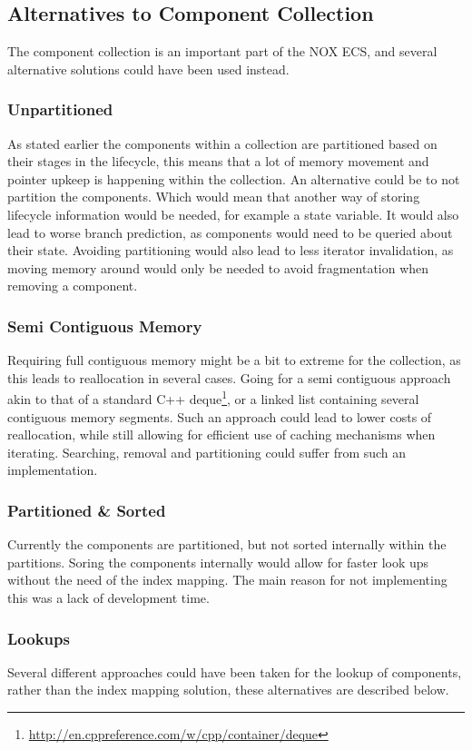 \subsection{Alternatives to Component Collection}
The component collection is an important part of the NOX ECS, and several alternative solutions could have been used instead.

\subsubsection{Unpartitioned}
As stated earlier the components within a collection are partitioned based on their stages in the lifecycle,
this means that a lot of memory movement and pointer upkeep is happening within the collection.
An alternative could be to not partition the components. Which would mean that another way of storing
lifecycle information would be needed, for example a state variable.
It would also lead to worse branch prediction, as components would need to be queried about their state.
Avoiding partitioning would also lead to less iterator invalidation, as moving memory around would
only be needed to avoid fragmentation when removing a component.

\subsubsection{Semi Contiguous Memory}
Requiring full contiguous memory might be a bit to extreme for the collection, as this leads to
reallocation in several cases. Going for a semi contiguous approach akin to that of a standard C++ deque\footnote{\url{http://en.cppreference.com/w/cpp/container/deque}},
or a linked list containing several contiguous memory segments.
Such an approach could lead to lower costs of reallocation, while still allowing for efficient use of caching mechanisms
when iterating.
Searching, removal and partitioning could suffer from such an implementation.

\subsubsection{Partitioned \& Sorted}
Currently the components are partitioned, but not sorted internally within the partitions.
Soring the components internally would allow for faster look ups without the need of the index mapping.
The main reason for not implementing this was a lack of development time.

\subsubsection{Lookups}
Several different approaches could have been taken for the lookup of components, rather than the index mapping solution,
these alternatives are described below.

